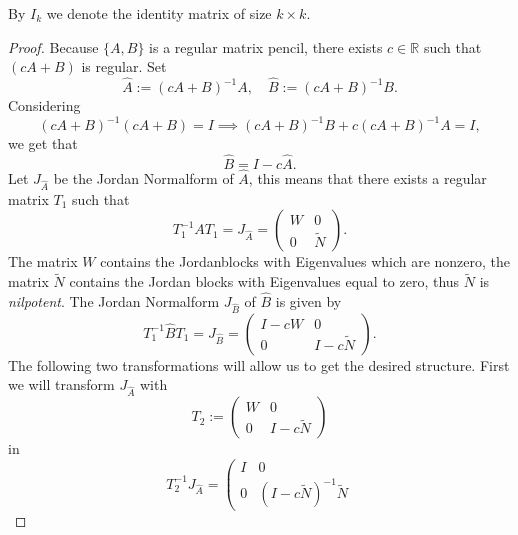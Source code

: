By $I_k$ we denote the identity matrix of size $k \times k$.

\begin{proof}
	Because $\{A,B\}$ is a regular matrix pencil, there exists $c \in \mathbb{R}$ such that $(cA+B)$ is regular. Set
	\begin{displaymath}
		\hat{A} := (cA+B)^{-1}A, \quad \hat{B} := (cA+B)^{-1}B.
	\end{displaymath}
	Considering 
	\begin{displaymath}
		(cA+B)^{-1}(cA+B) = I \implies (cA+B)^{-1}B+c(cA+B)^{-1}A = I ,
	\end{displaymath}
	we get that
	\begin{displaymath}
		\hat{B} = I-c \hat{A} .
	\end{displaymath}
	Let $J_ {\hat{A}}$ be the Jordan Normalform of $\hat{A}$, this means that there exists a regular matrix $T_1$ such that
	\begin{displaymath}
		T_1^{-1}AT_1 = J_{\hat{A}} =
		\left(
		\begin{matrix}
			W & 0 \\
			0 & \tilde{N} 
		\end{matrix}
		\right) .
	\end{displaymath}
	The matrix $W$ contains the Jordanblocks with Eigenvalues which are nonzero, the matrix $\tilde{N}$ contains the Jordan blocks with Eigenvalues equal to zero, thus $\tilde{N}$ is \emph{nilpotent}.
	The Jordan Normalform $J_{\hat{B}}$ of $\hat{B}$ is given by
	\begin{displaymath}
		T_1^{-1} \hat{B} T_1 = J_{\hat{B}} = 
		\left(
		\begin{matrix}
			I-cW & 0 \\
			0 & I-c\tilde{N}
		\end{matrix}
		\right) .
	\end{displaymath}
	The following two transformations will allow us to get the desired structure.
	First we will transform $J_{\hat{A}}$ with
	\begin{displaymath}
		T_2 :=
		\left(
		\begin{matrix}
			W & 0 \\
			0 & I-c\tilde{N}
		\end{matrix}
		\right)
	\end{displaymath}
	in
	\begin{displaymath}
		T_2^{-1}J_{\hat{A}} = 
		\left(
		\begin{matrix}
			I & 0 \\
			0 & (I-c\tilde{N})^{-1}\tilde{N}

\end{matrix}
\end{displaymath}
\end{proof}
